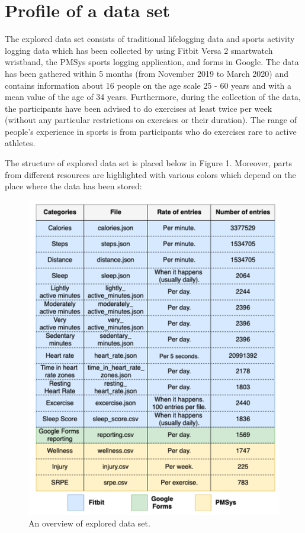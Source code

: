 \section{Profile of a data set}
The explored data set consists of traditional lifelogging data and sports activity logging data which has been collected by using Fitbit Versa 2 smartwatch wristband, the PMSys sports logging application, and forms in Google. The data has been gathered within 5 months (from November 2019 to March 2020) and contains information about 16 people on the age scale 25 - 60 years and with a mean value of the age of 34 years. Furthermore, during the collection of the data, the participants have been advised to do exercises at least twice per week (without any particular restrictions on exercises or their duration). The range of people's experience in sports is from participants who do exercises rare to active athletes.

The structure of explored data set is placed below in Figure 1. Moreover, parts from different resources are highlighted with various colors which depend on the place where the data has been stored:

\begin{figure}[h]
\centerline{\includegraphics{structure.png}}
\caption{An overview of explored data set.}
\label{fig}
\end{figure}

